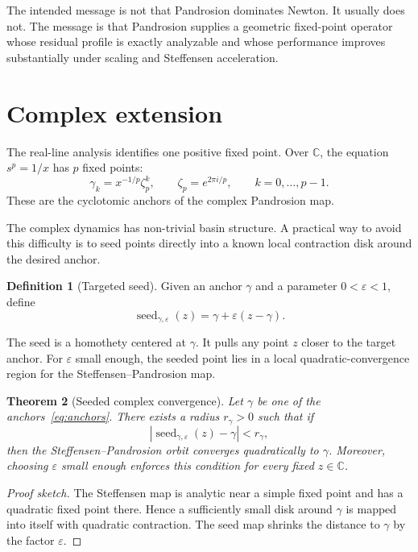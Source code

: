 \documentclass[11pt,a4paper]{article}
\theoremstyle{plain}
\newtheorem{theorem}{Theorem}[section]
\theoremstyle{definition}
\newtheorem{definition}[theorem]{Definition}
\theoremstyle{remark}
\newcommand{\C}{\mathbb{C}}
\newcommand{\eps}{\varepsilon}
\begin{document}
The intended message is not that Pandrosion dominates Newton.  It usually does
not.  The message is that Pandrosion supplies a geometric fixed-point operator
whose residual profile is exactly analyzable and whose performance improves
substantially under scaling and Steffensen acceleration.

\section{Complex extension}
\label{sec:complex}

The real-line analysis identifies one positive fixed point.  Over $\C$, the
equation $s^p=1/x$ has $p$ fixed points:
\begin{equation}
  \gamma_k=x^{-1/p}\zeta_p^k,
  \qquad
  \zeta_p=e^{2\pi i/p},
  \qquad k=0,\dots,p-1.
  \label{eq:anchors}
\end{equation}
These are the cyclotomic anchors of the complex Pandrosion map.

The complex dynamics has non-trivial basin structure.  A practical way to avoid
this difficulty is to seed points directly into a known local contraction disk
around the desired anchor.

\begin{definition}[Targeted seed]
Given an anchor $\gamma$ and a parameter $0<\eps<1$, define
\[
  \operatorname{seed}_{\gamma,\eps}(z)
  =\gamma+\eps(z-\gamma).
\]
\end{definition}

The seed is a homothety centered at $\gamma$.  It pulls any point $z$ closer to
the target anchor.  For $\eps$ small enough, the seeded point lies in a local
quadratic-convergence region for the Steffensen--Pandrosion map.

\begin{theorem}[Seeded complex convergence]
Let $\gamma$ be one of the anchors~\eqref{eq:anchors}.  There exists a radius
$r_\gamma>0$ such that if
\[
  |\operatorname{seed}_{\gamma,\eps}(z)-\gamma|<r_\gamma,
\]
then the Steffensen--Pandrosion orbit converges quadratically to $\gamma$.
Moreover, choosing $\eps$ small enough enforces this condition for every fixed
$z\in\C$.
\end{theorem}

\begin{proof}[Proof sketch]
The Steffensen map is analytic near a simple fixed point and has a quadratic
fixed point there.  Hence a sufficiently small disk around $\gamma$ is mapped
into itself with quadratic contraction.  The seed map shrinks the distance to
$\gamma$ by the factor $\eps$.
\end{proof}
\end{document}
